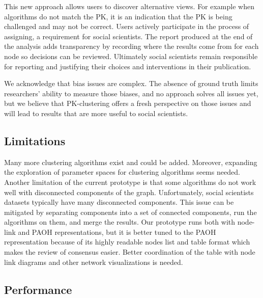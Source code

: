 This new approach allows users to discover alternative views. For example when algorithms do not match the PK, it is an indication that the PK is being challenged and may not be correct.  Users actively participate in the process of assigning, a requirement for social scientists. The report produced at the end of the analysis adds transparency by recording where the results come from for each node so decisions can be reviewed. Ultimately social scientists remain responsible for reporting and justifying their choices and interventions in their publication.

We acknowledge that bias issues are complex. The absence of ground truth limits researchers' ability to measure those biases, and no approach solves all issues yet, but we believe that PK-clustering offers a fresh perspective on those issues and will lead to results that are more useful to social scientists.

\subsection{Limitations}

Many more clustering algorithms exist and could be added.
Moreover, expanding the exploration of parameter spaces for clustering algorithms seems needed.  Another limitation of the current prototype is that some algorithms do not work well with disconnected components of the graph. Unfortunately, social scientists datasets typically have many disconnected components. This issue can be mitigated by separating components into a set of connected components, run the algorithms on them, and merge the results.
Our prototype runs both with node-link and PAOH representations, but it is better tuned to the PAOH representation because of its highly readable nodes list and table format which makes the review of consensus easier. Better coordination of the table with node link diagrams and other network visualizations is needed.

\subsection{Performance}
\label{sub:performances}

